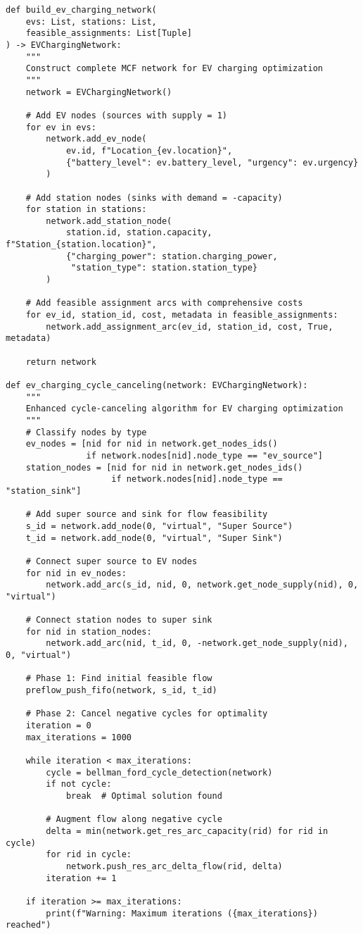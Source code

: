 \documentclass[12pt,a4paper]{article}
\begin{document}
\begin{lstlisting}[caption=MCF Network Builder and Optimizer,label=lst:mcf]
def build_ev_charging_network(
    evs: List, stations: List, 
    feasible_assignments: List[Tuple]
) -> EVChargingNetwork:
    """
    Construct complete MCF network for EV charging optimization
    """
    network = EVChargingNetwork()
    
    # Add EV nodes (sources with supply = 1)
    for ev in evs:
        network.add_ev_node(
            ev.id, f"Location_{ev.location}",
            {"battery_level": ev.battery_level, "urgency": ev.urgency}
        )
    
    # Add station nodes (sinks with demand = -capacity)
    for station in stations:
        network.add_station_node(
            station.id, station.capacity, f"Station_{station.location}",
            {"charging_power": station.charging_power, 
             "station_type": station.station_type}
        )
    
    # Add feasible assignment arcs with comprehensive costs
    for ev_id, station_id, cost, metadata in feasible_assignments:
        network.add_assignment_arc(ev_id, station_id, cost, True, metadata)
    
    return network

def ev_charging_cycle_canceling(network: EVChargingNetwork):
    """
    Enhanced cycle-canceling algorithm for EV charging optimization
    """
    # Classify nodes by type
    ev_nodes = [nid for nid in network.get_nodes_ids() 
                if network.nodes[nid].node_type == "ev_source"]
    station_nodes = [nid for nid in network.get_nodes_ids() 
                     if network.nodes[nid].node_type == "station_sink"]

    # Add super source and sink for flow feasibility
    s_id = network.add_node(0, "virtual", "Super Source")
    t_id = network.add_node(0, "virtual", "Super Sink")
    
    # Connect super source to EV nodes
    for nid in ev_nodes:
        network.add_arc(s_id, nid, 0, network.get_node_supply(nid), 0, "virtual")
    
    # Connect station nodes to super sink
    for nid in station_nodes:
        network.add_arc(nid, t_id, 0, -network.get_node_supply(nid), 0, "virtual")

    # Phase 1: Find initial feasible flow
    preflow_push_fifo(network, s_id, t_id)

    # Phase 2: Cancel negative cycles for optimality
    iteration = 0
    max_iterations = 1000
    
    while iteration < max_iterations:
        cycle = bellman_ford_cycle_detection(network)
        if not cycle:
            break  # Optimal solution found
        
        # Augment flow along negative cycle
        delta = min(network.get_res_arc_capacity(rid) for rid in cycle)
        for rid in cycle:
            network.push_res_arc_delta_flow(rid, delta)
        iteration += 1
    
    if iteration >= max_iterations:
        print(f"Warning: Maximum iterations ({max_iterations}) reached")
\end{lstlisting}
\end{document}
